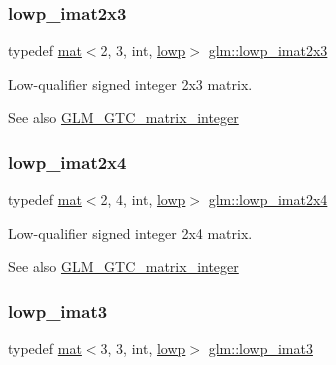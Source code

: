 \subsubsection{\texorpdfstring{lowp\+\_\+imat2x3}{lowp\_imat2x3}}
{\footnotesize\ttfamily typedef \mbox{\hyperlink{structglm_1_1mat}{mat}}$<$2, 3, int, \mbox{\hyperlink{namespaceglm_a36ed105b07c7746804d7fdc7cc90ff25ae161af3fc695e696ce3bf69f7332bc2d}{lowp}}$>$ \mbox{\hyperlink{group__gtc__matrix__integer_ga4b3b731b3f8ad88feee31e945c3618ca}{glm\+::lowp\+\_\+imat2x3}}}

Low-\/qualifier signed integer 2x3 matrix. \begin{DoxySeeAlso}{See also}
\mbox{\hyperlink{group__gtc__matrix__integer}{G\+L\+M\+\_\+\+G\+T\+C\+\_\+matrix\+\_\+integer}} 
\end{DoxySeeAlso}
\mbox{\label{group__gtc__matrix__integer_gabd8679c1108586fa89539a8bf029ad57}} 
\subsubsection{\texorpdfstring{lowp\+\_\+imat2x4}{lowp\_imat2x4}}
{\footnotesize\ttfamily typedef \mbox{\hyperlink{structglm_1_1mat}{mat}}$<$2, 4, int, \mbox{\hyperlink{namespaceglm_a36ed105b07c7746804d7fdc7cc90ff25ae161af3fc695e696ce3bf69f7332bc2d}{lowp}}$>$ \mbox{\hyperlink{group__gtc__matrix__integer_gabd8679c1108586fa89539a8bf029ad57}{glm\+::lowp\+\_\+imat2x4}}}

Low-\/qualifier signed integer 2x4 matrix. \begin{DoxySeeAlso}{See also}
\mbox{\hyperlink{group__gtc__matrix__integer}{G\+L\+M\+\_\+\+G\+T\+C\+\_\+matrix\+\_\+integer}} 
\end{DoxySeeAlso}
\mbox{\label{group__gtc__matrix__integer_gab66eef83170eea33b73938c19a82e4a0}} 
\subsubsection{\texorpdfstring{lowp\+\_\+imat3}{lowp\_imat3}}
{\footnotesize\ttfamily typedef \mbox{\hyperlink{structglm_1_1mat}{mat}}$<$3, 3, int, \mbox{\hyperlink{namespaceglm_a36ed105b07c7746804d7fdc7cc90ff25ae161af3fc695e696ce3bf69f7332bc2d}{lowp}}$>$ \mbox{\hyperlink{group__gtc__matrix__integer_gab66eef83170eea33b73938c19a82e4a0}{glm\+::lowp\+\_\+imat3}}}

